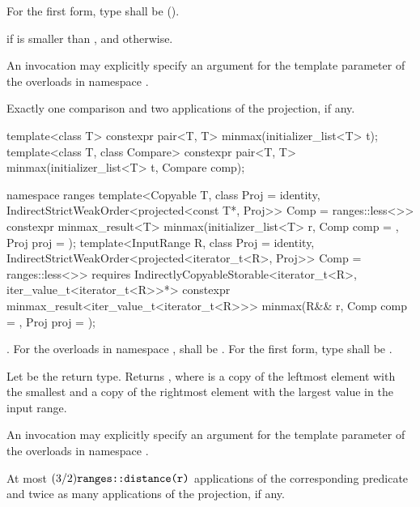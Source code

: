 \begin{itemdescr}
\pnum
\requires
For the first form, type  shall be
 ().

\pnum
\returns
{} if  is smaller than , and
 otherwise.

\pnum
\remarks
An invocation may explicitly specify an argument
for the template parameter 
of the overloads in namespace .

\pnum
\complexity
Exactly one comparison and two applications of the projection, if any.
\end{itemdescr}

%
\begin{itemdecl}
template<class T>
  constexpr pair<T, T> minmax(initializer_list<T> t);
template<class T, class Compare>
  constexpr pair<T, T> minmax(initializer_list<T> t, Compare comp);

namespace ranges {
  template<Copyable T, class Proj = identity,
      IndirectStrictWeakOrder<projected<const T*, Proj>> Comp = ranges::less<>>
    constexpr minmax_result<T>
      minmax(initializer_list<T> r, Comp comp = {}, Proj proj = {});
  template<InputRange R, class Proj = identity,
      IndirectStrictWeakOrder<projected<iterator_t<R>, Proj>> Comp = ranges::less<>>
    requires IndirectlyCopyableStorable<iterator_t<R>, iter_value_t<iterator_t<R>>*>
    constexpr minmax_result<iter_value_t<iterator_t<R>>>
      minmax(R&& r, Comp comp = {}, Proj proj = {});
}
\end{itemdecl}

\begin{itemdescr}
\pnum
\requires
{}.
For the overloads in namespace ,
 shall be .
For the first form, type  shall be .

\pnum
\returns
Let  be the return type. Returns
, where  is a copy of the leftmost element with
the smallest and  a copy of the rightmost element with the
largest value in the input range.

\pnum
\remarks
An invocation may explicitly specify an argument
for the template parameter 
of the overloads in namespace .

\pnum
\complexity
At most $(3/2)\texttt{ranges::distance(r)}$ applications of the corresponding predicate
and twice as many applications of the projection, if any.
\end{itemdescr}

